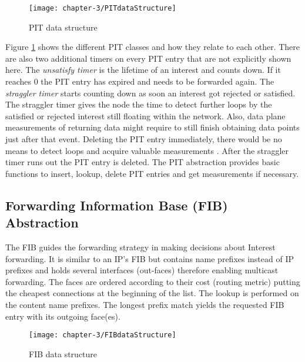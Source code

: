 \vspace{5mm} %

\begin{figure}[H]
  \centering
  \texttt{[image: chapter-3/PITdataStructure]}
  \caption{PIT data structure \cite{Afanasyev16}}
  \label{fig:PITdataStructure}
\end{figure}

\vspace{5mm} %

Figure \ref{fig:PITdataStructure} shows the different PIT classes and how they relate to each other. There are also two additional timers on every PIT entry that are not explicitly shown here. The \emph{unsatisfy timer} is the lifetime of an interest and counts down. If it reaches 0 the PIT entry has expired and needs to be forwarded again. The \emph{straggler timer} starts counting down as soon an interest got rejected or satisfied. The straggler timer gives the node the time to detect further loops by the satisfied or rejected interest still floating within the network. Also, data plane measurements of returning data might require to still finish obtaining data points just after that event. Deleting the PIT entry immediately, there would be no means to detect loops and acquire valuable measurements \cite{Afanasyev16}. After the straggler timer runs out the PIT entry is deleted. The PIT abstraction provides basic functions to insert, lookup, delete PIT entries and get measurements if necessary.

\newpage

\subsection{Forwarding Information Base (FIB) Abstraction}

The FIB guides the forwarding strategy in making decisions about Interest forwarding. It is similar to an IP's FIB but contains name prefixes instead of IP prefixes and holds several interfaces (out-faces) therefore enabling multicast forwarding. The faces are ordered according to their cost (routing metric) putting the cheapest connections at the beginning of the list. The lookup is performed on the content name prefixes. The longest prefix match yields the requested FIB entry with its outgoing face(es).

\vspace{5mm} %

\begin{figure}[H]
  \centering
  \texttt{[image: chapter-3/FIBdataStructure]}
  \caption{FIB data structure \cite{Afanasyev16}}
  \label{fig:FIBdataStructure}
\end{figure}

